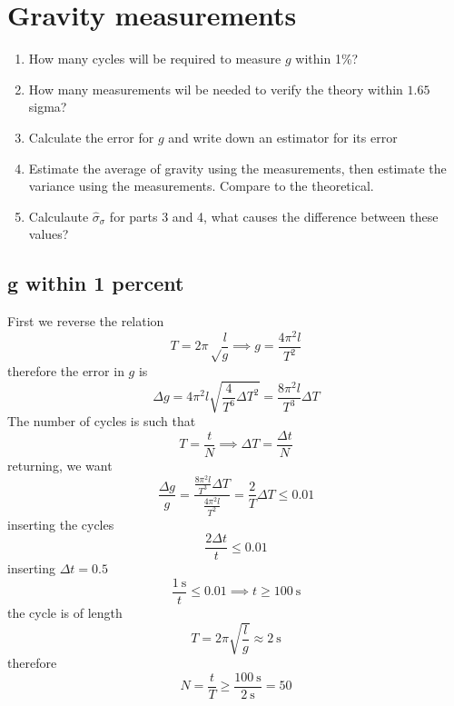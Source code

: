 \clearpage
\section{Gravity measurements}
\begin{colbox}
    \begin{enumerate}
        \item How many cycles will be required to measure \(g\) within 1\%?
        \item How many measurements wil be needed to verify the theory within \(1.65\) sigma?
        \item Calculate the error for \(g\) and write down an estimator for its error
        \item Estimate the average of gravity using the measurements, then estimate the variance using the measurements. Compare to the theoretical.
        \item Calculaute \(\hat{\sigma}_\sigma\) for parts 3 and 4, what causes the difference between these values?
    \end{enumerate}
\end{colbox}
\subsection{g within 1 percent}
First we reverse the relation
\begin{equation}
    T = 2\pi\sqrt\frac{l}{g} \implies g = \frac{4\pi^2l}{T^2}
\end{equation}
therefore the error in \(g\) is
\begin{equation}
    \Delta g = 4\pi^2l\sqrt{\frac{4}{T^6}\Delta T^2} = \frac{8\pi^2l}{T^3}\Delta T
\end{equation}
The number of cycles is such that
\begin{equation}
    T = \frac{t}{N} \implies \Delta T = \frac{\Delta t}{N}
\end{equation}
returning, we want
\begin{equation}
    \frac{\Delta g}{g} = \frac{\frac{8\pi^2l}{T^3}\Delta T}{\frac{4\pi^2l}{T^2}} = \frac{2}{T}\Delta T \leq 0.01
\end{equation}
inserting the cycles
\begin{equation}
    \frac{2\Delta t}{t} \leq 0.01
\end{equation}
inserting \(\Delta t = 0.5\)
\begin{equation}
    \frac{\qty{1}{\second}}{t}\leq 0.01 \implies t \geq \qty{100}{\second}
\end{equation}
the cycle is of length
\begin{equation}
    T = 2\pi\sqrt{\frac{l}{g}} \approx \qty{2}{\second}
\end{equation}
therefore
\begin{equation}
    N = \frac{t}{T} \geq \frac{\qty{100}{\second}}{\qty{2}{\second}} = 50
\end{equation}

